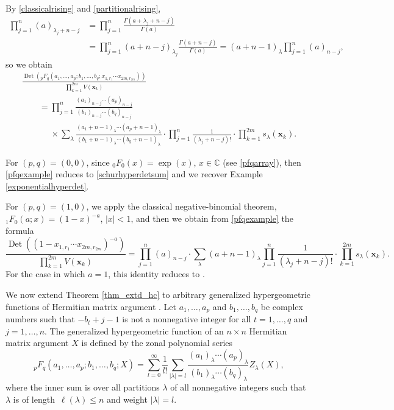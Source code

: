 \documentclass[pdftex]{sigma}
\numberwithin{equation}{section}
\def\C{{\mathbb C}}
\def\Det{\operatorname{Det}}
\def\xx{\boldsymbol{x}}
\begin{document}
\begin{Example}
By \eqref{classicalrising} and \eqref{partitionalrising},
\begin{align*}
\prod_{j=1}^n (a)_{\lambda_j+n-j} &= \prod_{j=1}^n \frac{\Gamma(a+\lambda_j+n-j)}{\Gamma(a)} \\
&= \prod_{j=1}^n (a+n-j)_{\lambda_j} \frac{\Gamma(a+n-j)}{\Gamma(a)}
= (a+n-1)_\lambda \prod_{j=1}^n (a)_{n-j},
\end{align*}
so we obtain
\begin{gather}
 \frac{\Det({}_pF_q(a_1,\dots,a_p;b_1,\dots,b_q;x_{1,r_1} \cdots x_{2m,r_{2m}}))}{\prod_{k=1}^{2m} V(\xx_k)} \nonumber \\
\qquad
= \prod_{j=1}^n \frac{(a_1)_{n-j} \cdots (a_p)_{n-j}}{(b_1)_{n-j} \cdots (b_q)_{n-j}} \nonumber \\
\phantom{\qquad
=}{} \times \sum_\lambda \frac{(a_1+n-1)_\lambda \cdots (a_p+n-1)_\lambda}{(b_1+n-1)_\lambda \cdots (b_q+n-1)_\lambda} \cdot \prod_{j=1}^n \frac{1}{(\lambda_j+n-j)!} \cdot \prod_{k=1}^{2m} s_\lambda(\xx_k).\label{pfqexample}
\end{gather}

For $(p,q) = (0,0)$, since ${}_0F_0(x) = \exp(x)$, $x \in \C$ (see \eqref{pfqarray}), then \eqref{pfqexample} reduces to \eqref{schurhyperdetsum} and we recover Example \ref{exponentialhyperdet}.

For $(p,q) = (1,0)$, we apply the classical negative-binomial theorem, ${}_1F_0(a;x) = (1-x)^{-a}$, $|x| < 1$, and then we obtain from \eqref{pfqexample} the formula
\[
\frac{\Det((1-x_{1,r_1} \cdots x_{2m,r_{2m}})^{-a})}{\prod_{k=1}^{2m} V(\xx_k)}
= \prod_{j=1}^n (a)_{n-j} \cdot \sum_\lambda (a+n-1)_\lambda \prod_{j=1}^n \frac{1}{(\lambda_j+n-j)!} \cdot \prod_{k=1}^{2m} s_\lambda(\xx_k).
\]
For the case in which $a = 1$, this identity reduces to \cite[Corollary 3.2]{matsumoto}.
\end{Example}

We now extend Theorem \ref{thm_extd_hc} to arbitrary generalized hypergeometric functions of Hermitian matrix argument \cite{grossrichards87,grossrichards89}. Let $a_1,\dots,a_p$ and $b_1,\dots,b_q$ be complex numbers such that $-b_t+j-1$ is not a nonnegative integer for all $t=1,\dots,q$ and $j=1,\dots,n$. The generalized hypergeometric function of an $n \times n$ Hermitian matrix argument $X$ is defined by the zonal polynomial series
\begin{equation}
\label{matrixargpfq}
{}_pF_q(a_1,\dots,a_p;b_1,\dots,b_q;X) = \sum_{l=0}^\infty \frac{1}{l!} \sum_{|\lambda|=l} \frac{(a_1)_\lambda\cdots (a_p)_\lambda}{(b_1)_\lambda \cdots (b_q)_\lambda} Z_\lambda(X),
\end{equation}
where the inner sum is over all partitions $\lambda$ of all nonnegative integers such that $\lambda$ is of length~${\ell(\lambda) \le n}$ and weight $|\lambda|=l$.
\end{document}
